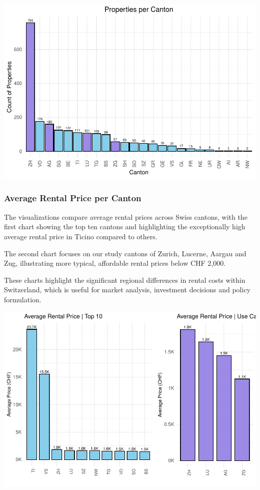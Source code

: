 \documentclass[
]{article}
\begin{document}
\includegraphics{2024_groupXX_report_files/figure-latex/Properties per Canton-1.pdf}

\subsubsection{Average Rental Price per
Canton}\label{average-rental-price-per-canton}

The visualizations compare average rental prices across Swiss cantons,
with the first chart showing the top ten cantons and highlighting the
exceptionally high average rental price in Ticino compared to others.

The second chart focuses on our study cantons of Zurich, Lucerne, Aargau
and Zug, illustrating more typical, affordable rental prices below CHF
2,000.

These charts highlight the significant regional differences in rental
costs within Switzerland, which is useful for market analysis,
investment decisions and policy formulation.

\includegraphics{2024_groupXX_report_files/figure-latex/unnamed-chunk-1-1.pdf}
\end{document}
